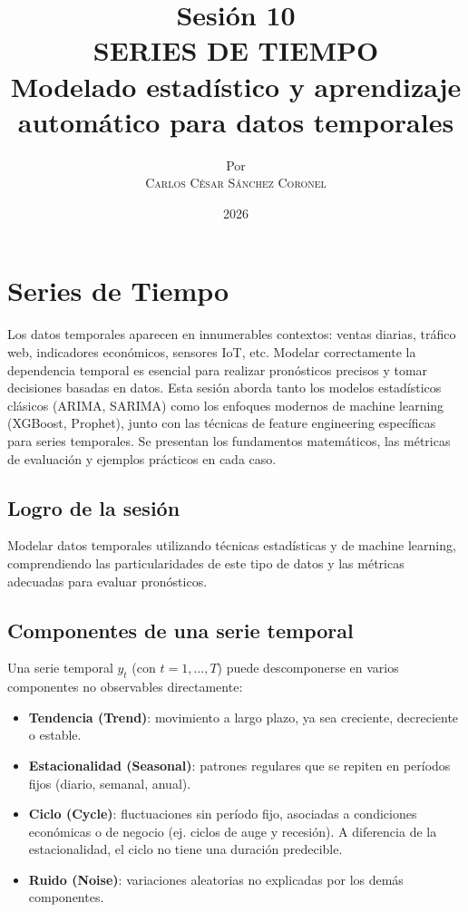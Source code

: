 \documentclass[12pt,a4paper,openany,oneside]{book}
\title{
    \textbf{Sesión 10} \\ 
    \Huge \textbf{SERIES DE TIEMPO} \\
    \Large Modelado estadístico y aprendizaje automático para datos temporales
}
\author{
    \small Por \\ \vspace{0.2cm}
    \Large \textsc{Carlos César Sánchez Coronel}
}
\date{2026}
\begin{document}
\maketitle
\tableofcontents
{}

\chapter{Series de Tiempo}

Los datos temporales aparecen en innumerables contextos: ventas diarias, tráfico web, indicadores económicos, sensores IoT, etc. Modelar correctamente la dependencia temporal es esencial para realizar pronósticos precisos y tomar decisiones basadas en datos. Esta sesión aborda tanto los modelos estadísticos clásicos (ARIMA, SARIMA) como los enfoques modernos de machine learning (XGBoost, Prophet), junto con las técnicas de feature engineering específicas para series temporales. Se presentan los fundamentos matemáticos, las métricas de evaluación y ejemplos prácticos en cada caso.

\section{Logro de la sesión}
Modelar datos temporales utilizando técnicas estadísticas y de machine learning, comprendiendo las particularidades de este tipo de datos y las métricas adecuadas para evaluar pronósticos.

\section{Componentes de una serie temporal}

Una serie temporal \(y_t\) (con \(t=1,\dots,T\)) puede descomponerse en varios componentes no observables directamente:

\begin{itemize}
    \item \textbf{Tendencia (Trend)}: movimiento a largo plazo, ya sea creciente, decreciente o estable.
    \item \textbf{Estacionalidad (Seasonal)}: patrones regulares que se repiten en períodos fijos (diario, semanal, anual).
    \item \textbf{Ciclo (Cycle)}: fluctuaciones sin período fijo, asociadas a condiciones económicas o de negocio (ej. ciclos de auge y recesión). A diferencia de la estacionalidad, el ciclo no tiene una duración predecible.
    \item \textbf{Ruido (Noise)}: variaciones aleatorias no explicadas por los demás componentes.
\end{itemize}
\end{document}
